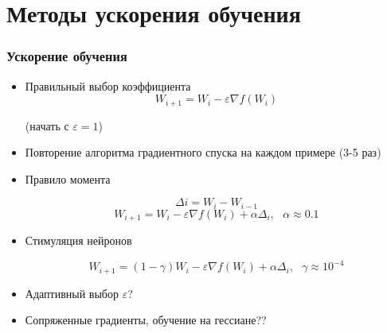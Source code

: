 \documentclass[24pt,pdf,hyperref={unicode},aspectratio=169]{beamer}
\begin{document}
\section{Методы ускорения обучения}
\begin{frame}\frametitle{Ускорение обучения}

\begin{itemize}
\item<+-> Правильный выбор коэффициента
$$
W_{i+1}=W_i-\varepsilon \nabla f(W_i)
$$

(начать с $\varepsilon=1$)

\item<+-> Повторение алгоритма градиентного спуска на каждом примере (3-5 раз)

\item<+-> Правило момента

$$
\Delta{i} = W_{i}-W_{i-1}
$$
$$
W_{i+1} = W_i-\varepsilon \nabla f(W_i)+\alpha\Delta_i, \ \ \ 
\alpha\approx 0.1
$$
\item<+-> Стимуляция нейронов

$$
W_{i+1} = (1-\gamma)W_i-\varepsilon \nabla f(W_i)+\alpha\Delta_i,\ \ \ 
\gamma \approx 10^{-4}
$$

\item<+-> Адаптивный выбор $\varepsilon$?

\item<+-> Сопряженные градиенты, обучение на гессиане??
\end{itemize}


\end{frame}
\end{document}
